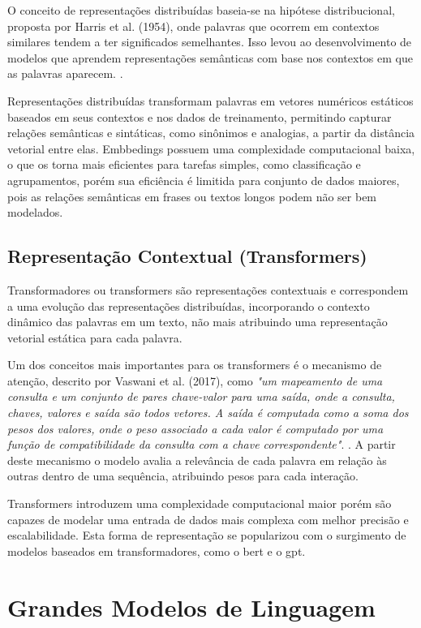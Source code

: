 O conceito de representações distribuídas baseia-se na hipótese distribucional, proposta por Harris et al. (1954), onde palavras que ocorrem em contextos similares tendem a ter significados semelhantes. Isso levou ao desenvolvimento de modelos que aprendem representações semânticas com base nos contextos em que as palavras aparecem. \cite{Harris1954}.

Representações distribuídas transformam palavras em vetores numéricos estáticos baseados em seus contextos e nos dados de treinamento, permitindo capturar relações semânticas e sintáticas, como sinônimos e analogias, a partir da distância vetorial entre elas. Embbedings possuem uma complexidade computacional baixa, o que os torna mais eficientes para tarefas simples, como classificação e agrupamentos, porém sua eficiência é limitida para conjunto de dados maiores, pois as relações semânticas em frases ou textos longos podem não ser bem modelados.

\subsection{Representação Contextual (Transformers)}\label{subsec:transformers}

Transformadores ou transformers são representações contextuais e correspondem a uma evolução das representações distribuídas, incorporando o contexto dinâmico das palavras em um texto, não mais atribuindo uma representação vetorial estática para cada palavra. 

Um dos conceitos mais importantes para os transformers é o mecanismo de atenção, descrito por Vaswani et al. (2017), como \textit{"um mapeamento de uma consulta e um conjunto de pares chave-valor para uma saída, onde a consulta, chaves, valores e saída são todos vetores. A saída é computada como a soma dos pesos dos valores, onde o peso associado a cada valor é computado por uma função de compatibilidade da consulta com a chave correspondente"}. \cite{VaswaniTransformer2017}. A partir deste mecanismo o modelo avalia a relevância de cada palavra em relação às outras dentro de uma sequência, atribuindo pesos para cada interação.

Transformers introduzem uma complexidade computacional maior porém são capazes de modelar uma entrada de dados mais complexa com melhor precisão e escalabilidade. Esta forma de representação se popularizou com o surgimento de modelos baseados em transformadores, como o \gls{bert} e o \gls{gpt}.

\section{Grandes Modelos de Linguagem}\label{sec:llm}

